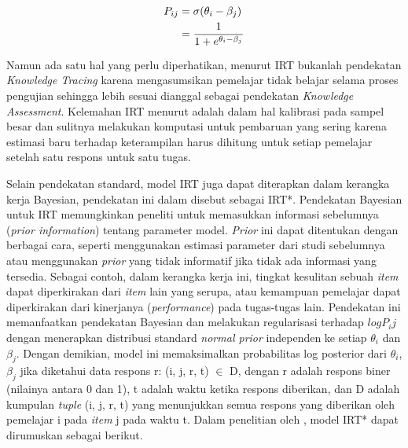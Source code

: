 \begin{align}
P_{ij} &= \sigma(\theta_i - \beta_j) \notag \\
     &= \frac{1}{1 + e^{\theta_i - \beta_j}} \label{eq:rumus_irt}
\end{align}


Namun ada satu hal yang perlu diperhatikan, menurut \textcite{Minn2022} IRT bukanlah pendekatan \textit{Knowledge Tracing} 
karena mengasumsikan pemelajar tidak belajar selama proses pengujian sehingga lebih sesuai dianggal sebagai pendekatan \textit{Knowledge Assessment}.
Kelemahan IRT menurut \textcite{Vesin2022} adalah dalam hal kalibrasi pada sampel besar dan sulitnya melakukan komputasi untuk pembaruan yang sering karena estimasi baru terhadap keterampilan harus dihitung untuk setiap pemelajar setelah satu respons untuk satu tugas.

Selain pendekatan standard, model IRT juga dapat diterapkan dalam
kerangka kerja Bayesian, pendekatan ini
dalam \textcite{Minn2022} disebut sebagai IRT*. Pendekatan Bayesian untuk IRT
memungkinkan peneliti untuk memasukkan informasi sebelumnya
(\textit{prior information}) tentang parameter model. \textit{Prior} ini
dapat ditentukan dengan berbagai cara, seperti menggunakan estimasi parameter
dari studi sebelumnya atau menggunakan \textit{prior} yang tidak informatif jika tidak ada informasi yang tersedia. Sebagai
contoh, dalam kerangka kerja ini, tingkat kesulitan sebuah \textit{item}
dapat diperkirakan dari \textit{item} lain yang serupa, atau kemampuan
pemelajar dapat diperkirakan dari kinerjanya (\textit{performance}) pada tugas-tugas
lain. Pendekatan ini memanfaatkan pendekatan Bayesian dan
melakukan regularisasi terhadap $log P_ij$ dengan menerapkan distribusi
standard \textit{normal prior} independen ke setiap $\theta_i$ dan $\beta_j$.
Dengan demikian, model ini memaksimalkan probabilitas log posterior dari {$\theta_i$, $\beta_j$}
jika diketahui data respons {r: (i, j, r, t) $\in$ D}, dengan r adalah respons biner (nilainya antara 0 dan 1),
t adalah waktu ketika respons diberikan, dan D adalah kumpulan \textit{tuple} (i, j, r, t) yang menunjukkan
semua respons yang diberikan oleh pemelajar i pada \textit{item} j pada waktu t. Dalam penelitian oleh \textcite{Minn2022},
model IRT* dapat dirumuskan sebagai berikut.

